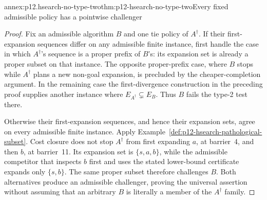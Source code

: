 \begin{annexitem}{annex:p12.hsearch-no-type-two}{thm:p12-hsearch-no-type-two}{Every fixed admissible policy has a pointwise challenger}
\begin{proof}
Fix an admissible algorithm \(B\) and one tie policy of
\(A^\dagger\). If their first-expansion sequences differ on any
admissible finite instance, first handle the case in which
\(A^\dagger\)'s sequence is a proper prefix of \(B\)'s: its
expansion set is already a proper subset on that instance. The opposite
proper-prefix case, where \(B\) stops while \(A^\dagger\)
plans a new non-goal expansion, is precluded by the cheaper-completion
argument. In the remaining case the first-divergence construction in the
preceding proof supplies another instance where
\(E_{A^\dagger}\subsetneq E_B\). Thus \(B\) fails the type-2
test there.

Otherwise their first-expansion sequences, and hence their expansion
sets, agree on every admissible finite instance. Apply
Example~\ref{def:p12-hsearch-pathological-subset}. Cost closure does
not stop \(A^\dagger\) from first expanding \(a\), at barrier~4,
and then \(b\), at barrier~11. Its expansion set is
\(\{s,a,b\}\), while the admissible competitor that inspects
\(b\) first and uses the stated lower-bound certificate expands
only \(\{s,b\}\). The same proper subset therefore challenges
\(B\). Both alternatives produce an admissible challenger, proving
the universal assertion without assuming that an arbitrary \(B\)
is literally a member of the \(A^\dagger\) family.
\end{proof}
\end{annexitem}

